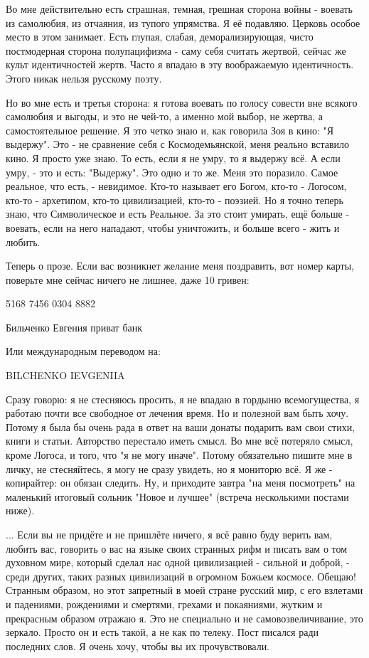 Во мне действительно есть страшная, темная, грешная сторона войны - воевать из
самолюбия, из отчаяния, из тупого упрямства. Я её подавляю. Церковь особое
место в этом занимает. Есть глупая, слабая, деморализирующая, чисто
постмодерная сторона полупацифизма - саму себя считать жертвой, сейчас же культ
идентичностей жертв. Часто я впадаю в эту воображаемую идентичность. Этого
никак нельзя русскому поэту.

Но во мне есть и третья сторона: я готова воевать по голосу совести вне всякого
самолюбия и выгоды, и это не чей-то, а именно мой выбор, не жертва, а
самостоятельное решение. Я это четко знаю и, как говорила Зоя в кино: "Я
выдержу". Это - не сравнение себя с Космодемьянской, меня реально вставило
кино. Я просто уже знаю. То есть, если я не умру, то я выдержу всё. А если
умру, - это и есть: "Выдержу". Это одно и то же. Меня это поразило. Самое
реальное, что есть, - невидимое. Кто-то называет его Богом, кто-то - Логосом,
кто-то - архетипом, кто-то цивилизацией, кто-то - поэзией. Но я точно теперь
знаю, что Символическое и есть Реальное. За это стоит умирать, ещё больше -
воевать, если на него нападают, чтобы уничтожить, и больше всего - жить и
любить.

Теперь о прозе. Если вас возникнет желание меня поздравить, вот номер карты,
поверьте мне сейчас ничего не лишнее, даже 10 гривен:

5168 7456 0304 8882 

Бильченко Евгения приват банк

Или международным переводом на:

BILCHENKO IEVGENIIA

Сразу говорю: я не стесняюсь просить, я не впадаю в гордыню всемогущества, я
работаю почти все свободное от лечения время. Но и полезной вам быть хочу.
Потому я была бы очень рада в ответ на ваши донаты подарить вам свои стихи,
книги и статьи. Авторство перестало иметь смысл. Во мне всё потеряло смысл,
кроме Логоса, и того, что "я не могу иначе". Потому обязательно пишите мне в
личку, не стесняйтесь, я могу не сразу увидеть, но я мониторю всё. Я же -
копирайтер: он обязан следить. Ну, и приходите завтра "на меня посмотреть" на
маленький итоговый сольник "Новое и лучшее" (встреча несколькими постами ниже).

... Если вы не придёте и не пришлёте ничего, я всё равно буду верить вам,
любить вас, говорить о вас на языке своих странных рифм и писать вам о том
духовном мире, который сделал нас одной цивилизацией - сильной и доброй, -
среди других, таких разных цивилизаций в огромном Божьем космосе. Обещаю!
Странным образом, но этот запретный в моей стране русский мир, с его взлетами и
падениями, рождениями и смертями, грехами и покаяниями, жутким и прекрасным
образом отражаю я. Это не специально и не самовозвеличивание, это зеркало.
Просто он и есть такой, а не как по телеку. Пост писался ради последних слов. Я
очень хочу, чтобы вы их прочувствовали.

